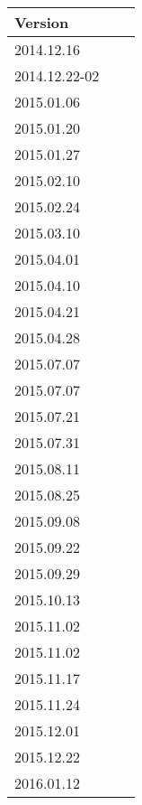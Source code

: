 \begin{table}[h!]
\parbox{.45\linewidth}{
\centering
\begin{tabular}{l*{1}{l}r}
\hline
Version  \\
\hline
2014.12.16      \\
2014.12.22-02   \\
2015.01.06      \\
2015.01.20      \\
2015.01.27      \\
2015.02.10      \\
2015.02.24      \\
2015.03.10      \\
2015.04.01      \\
2015.04.10      \\
2015.04.21      \\
2015.04.28      \\
2015.07.07      \\
2015.07.07      \\
2015.07.21      \\
2015.07.31      \\
2015.08.11      \\
2015.08.25      \\
2015.09.08      \\
2015.09.22      \\
2015.09.29      \\
2015.10.13      \\
2015.11.02      \\
2015.11.02      \\
2015.11.17      \\
2015.11.24      \\
2015.12.01      \\
2015.12.22      \\
2016.01.12 \\


\end{tabular}}
\end{table}
